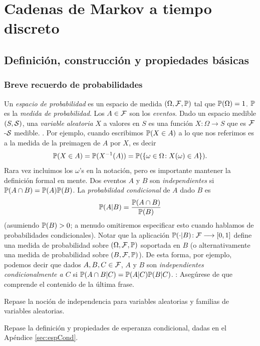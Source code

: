
\section{Cadenas de Markov a tiempo discreto}

\subsection{Definición, construcción y propiedades básicas}

\subsubsection{Breve recuerdo de probabilidades}

Un \emph{espacio de probabilidad} es un espacio de medida $(\Omega,\mathcal{F},\mathbb{P})$ tal que $\mathbb{P}(\Omega)=1$.
$\mathbb{P}$ es la \emph{medida de probabilidad}.
Los $A\in\mathcal{F}$ son los \emph{eventos}.
\lsep
Dado un espacio medible $(S,\mathcal{S})$, una \emph{variable aleatoria} $X$ a valores en $S$ es una función $X\!:\Omega\longrightarrow S$ que es $\mathcal{F}$-$\mathcal{S}$ medible.
.
Por ejemplo, cuando escribimos $\mathbb{P}(X\in A)$ a lo que nos referimos es a la medida de la preimagen de $A$ por $X$, es decir
\[\mathbb{P}(X\in A)=\mathbb{P}(X^{-1}(A))=\mathbb{P}(\{\omega\in \Omega\!:X(\omega)\in A\}).\]
Rara vez incluimos los $\omega$'s en la notación, pero es importante mantener la definición formal en mente.
\lsep Dos eventos $A$ y $B$ son \emph{independientes} si $\mathbb{P}(A\cap B)=\mathbb{P}(A)\mathbb{P}(B)$.
La \emph{probabilidad condicional} de $A$ dado $B$ es
\[\mathbb{P}(A|B)=\frac{\mathbb{P}(A\cap B)}{\mathbb{P}(B)}\]
(asumiendo $\mathbb{P}(B)>0$; a menudo omitiremos especificar esto cuando hablamos de probabilidades condicionales).
\lsep
Notar que la aplicación $\mathbb{P}(\cdot|B)\!:\mathcal{F}\longrightarrow[0,1]$ define una medida de probabilidad sobre $(\Omega,\mathcal{F},\mathbb{P})$ soportada en $B$ (o alternativamente una medida de probabilidad sobre $(B,\mathcal{F},\mathbb{P})$).
De esta forma, por ejemplo, podemos decir que dados $A,B,C\in\mathcal{F}$, $A$ y $B$ son \emph{independientes condicionalmente a $C$} si $\mathbb{P}(A\cap B|C)=\mathbb{P}(A|C)\mathbb{P}(B|C)$.
\uexer: Asegúrese de que comprende el contenido de la última frase.

\begin{sqgnote}
Repase la noción de independencia para variables aleatorias y familias de variables aleatorias.
\end{sqgnote}
\begin{sqgnote}
Repase la definición y propiedades de esperanza condicional, dadas en el Apéndice \ref{sec:espCond}.
\end{sqgnote}


